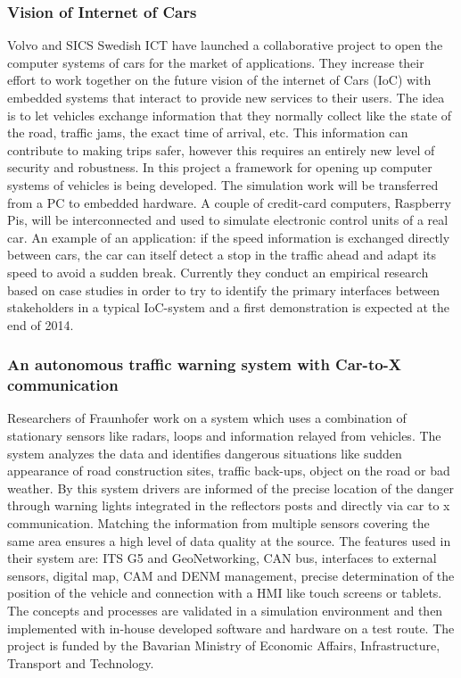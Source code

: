 \documentclass[a4paper]{article}
\begin{document}
\subsubsection{Vision of Internet of Cars}

Volvo and SICS Swedish ICT have launched a collaborative project to open the computer systems of cars for the market of applications. They increase their effort to work together on the future vision of the internet of Cars (IoC) with embedded systems that interact to provide new services to their users. The idea is to let vehicles exchange information that they normally collect like the state of the road, traffic jams, the exact time of arrival, etc. This information can contribute to making trips safer, however this requires an entirely new level of security and robustness. In this project a framework for opening up computer systems of vehicles is being developed. The simulation work will be transferred from a PC to embedded hardware. A couple of credit-card computers, Raspberry Pis, will be interconnected and used to simulate electronic control units of a real car. An example of an application: if the speed information is exchanged directly between cars, the car can itself detect a stop in the traffic ahead and adapt its speed to avoid a sudden break. Currently they conduct an empirical research based on case studies in order to try to identify the primary interfaces between stakeholders in a typical IoC-system and a first demonstration is expected at the end of 2014.

\subsubsection{An autonomous traffic warning system with Car-to-X communication}

Researchers of Fraunhofer work on a system which uses a combination of stationary sensors like radars, loops and information relayed from vehicles. The system analyzes the data and identifies dangerous situations like sudden appearance of road construction sites, traffic back-ups, object on the road or bad weather. By this system drivers are informed of the precise location of the danger through warning lights integrated in the reflectors posts and directly via car to x communication. Matching the information from multiple sensors covering the same area ensures a high level of data quality at the source. The features used in their system are: ITS G5 and GeoNetworking, CAN bus, interfaces to external sensors, digital map, CAM and DENM management, precise determination of the position of the vehicle and connection with a HMI like touch screens or tablets. The concepts and processes are validated in a simulation environment and then implemented with in-house developed software and hardware on a test route. The project is funded by the Bavarian Ministry of Economic Affairs, Infrastructure, Transport and Technology.
\end{document}
